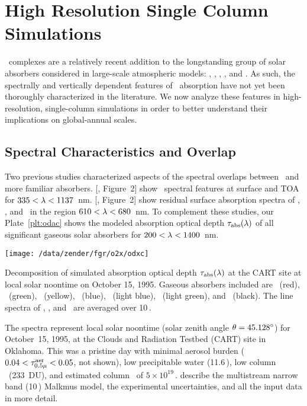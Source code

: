 \documentclass[agupp,twoside]{aguplus} %
\newlength{\fltwdtdblclm}\setlength{\fltwdtdblclm}{41.0pc} %
\begin{document}
\section{High Resolution Single Column Simulations}\label{sxn:spc}

\OdX\ complexes are a relatively recent addition to the longstanding
group of solar absorbers considered in large-scale atmospheric models:
\HdO, \Ot, \Od, \NOd, and \COd. 
As such, the spectrally and vertically dependent features of \OdX\
absorption have not yet been thoroughly characterized in the
literature. 
We now analyze these features in high-resolution, single-column
simulations in order to better understand their implications on
global-annual scales.

\subsection{Spectral Characteristics and Overlap}\label{sxn:ovr}
Two previous studies characterized aspects of the spectral overlaps
between \OdX\ and more familiar absorbers. 
\citeauthor{PEP97} [\citeyear{PEP97}, Figure~2] show \OdX\ spectral
features at surface and TOA for $335 < \lambda < 1137$~nm.
\citeauthor{SPS98} [\citeyear{SPS98}, Figure~2] show residual surface
absorption spectra of \OdOd, \Od, and \HdO\ in the region $610 < \lambda
< 680$~nm.    
To complement these studies, our Plate~\ref{plt:odac} shows the
modeled absorption optical depth $\tau_{\mathrm{abs}}(\lambda)$ of all significant
gaseous solar absorbers for $200 < \lambda < 1400$~nm.
\begin{plate*}
\begin{center}
\texttt{[image: /data/zender/fgr/o2x/odxc]}\vfill
\end{center}
\caption{
Decomposition of simulated absorption optical depth $\tau_{\mathrm{abs}}(\lambda)$ at
the CART site at local solar noontime on October 15, 1995.
Gaseous absorbers included are \OdOd\ (red), \OdNd\ (green), \HdO\
(yellow), \Ot\ (blue), \Od\ (light blue), \NOd\ (light green), and
\COd\ (black).   
The line spectra of \HdO, \COd, and \Od\ are averaged over 10\,\xcm.  
\label{plt:odac}}   
\end{plate*}
The spectra represent local solar noontime (solar zenith angle $\theta
= 45.128^{\circ}$) for October~15, 1995, at the Clouds and Radiation
Testbed (CART) site in Oklahoma.   
This was a pristine day with minimal aerosol burden ($0.04 <
\mbox{$\tau_{0.5\mu}^\mathrm{aer}$} < 0.05$, not shown), low precipitable water (11.6\,\kgxmS),
low column \Ot\ (233~DU), and estimated column \NOd\ of $5 \times 
10^{19}$\,\xmS.    
\cite{ZBP97} describe the multistream narrow band (10\,\xcm) Malkmus
model, the experimental uncertainties, and all the input data in more
detail.  
\end{document}
